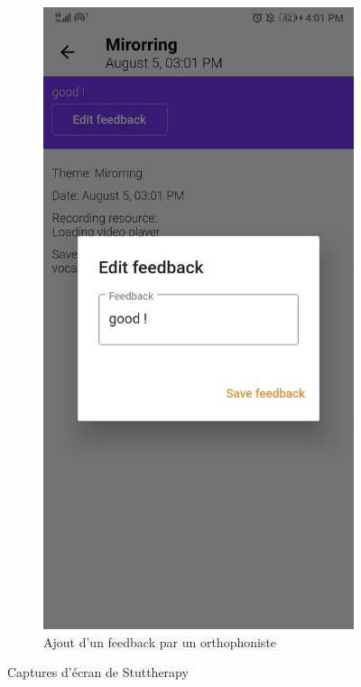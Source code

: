\begin{appendices}
\begin{landscape}
\begin{figure}[h]
\begin{subfigure}{.25\textwidth}
    \includegraphics[width=.75\linewidth]{content/imgs/screen18.jpg}
    \caption{Ajout d'un feedback par un orthophoniste}
    \label{appendix:screen_therapist3}
  \end{subfigure}


  \caption*{Captures d'écran de Stuttherapy}
\end{figure}


\end{landscape}
\end{appendices}
